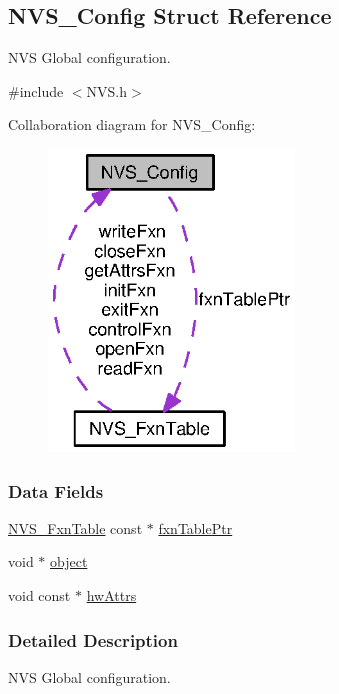 \subsection{N\+V\+S\+\_\+\+Config Struct Reference}
\label{struct_n_v_s___config}


N\+V\+S Global configuration.  




{\ttfamily \#include $<$N\+V\+S.\+h$>$}



Collaboration diagram for N\+V\+S\+\_\+\+Config\+:
\nopagebreak
\begin{figure}[H]
\begin{center}
\leavevmode
\includegraphics[width=185pt]{struct_n_v_s___config__coll__graph}
\end{center}
\end{figure}
\subsubsection*{Data Fields}
\begin{DoxyCompactItemize}
\item 
\hyperlink{struct_n_v_s___fxn_table}{N\+V\+S\+\_\+\+Fxn\+Table} const $\ast$ \hyperlink{struct_n_v_s___config_aa1ed9a9c3ec0a1f3c9a5fac057c55670}{fxn\+Table\+Ptr}
\item 
void $\ast$ \hyperlink{struct_n_v_s___config_a04d08bd3139ba6a6f51ccde721023b59}{object}
\item 
void const $\ast$ \hyperlink{struct_n_v_s___config_a96723351986b33e91fc9229d3bf517f1}{hw\+Attrs}
\end{DoxyCompactItemize}


\subsubsection{Detailed Description}
N\+V\+S Global configuration. 

